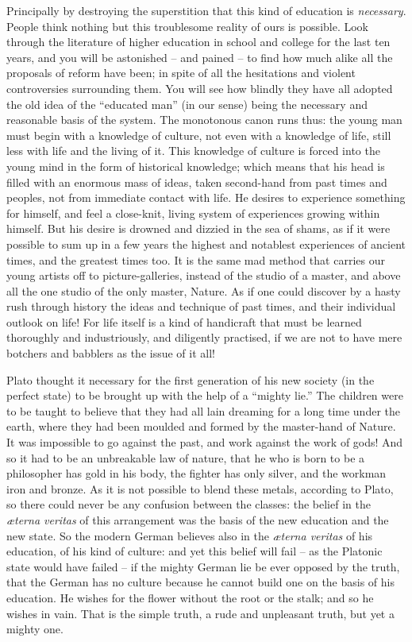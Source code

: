 Principally by destroying the superstition that this kind of
education is \textit{necessary}. People think nothing but this troublesome
reality of ours is possible. Look through the literature of higher
education in school and college for the last ten years, and you will
be astonished -- and pained -- to find how much alike all the proposals
of reform have been; in spite of all the hesitations and violent
controversies surrounding them. You will see how blindly they have
all adopted the old idea of the \enquote{educated man} (in our sense) being
the necessary and reasonable basis of the system. The monotonous
canon runs thus: the young man must begin with a knowledge of
culture, not even with a knowledge of life, still less with life and
the living of it. This knowledge of culture is forced into the young
mind in the form of historical knowledge; which means that his head
is filled with an enormous mass of ideas, taken second-hand from past
times and peoples, not from immediate contact with life. He desires
to experience something for himself, and feel a close-knit, living
system of experiences growing within himself. But his desire is
drowned and dizzied in the sea of shams, as if it were possible to
sum up in a few years the highest and notablest experiences of
ancient times, and the greatest times too. It is the same mad method
that carries our young artists off to picture-galleries, instead of
the studio of a master, and above all the one studio of the only
master, Nature. As if one could discover by a hasty rush through
history the ideas and technique of past times, and their individual
outlook on life! For life itself is a kind of handicraft that must be
learned thoroughly and industriously, and diligently practised, if we
are not to have mere botchers and babblers as the issue of it all!

Plato thought it necessary for the first generation of his new
society (in the perfect state) to be brought up with the help of a
\enquote{mighty lie.} The children were to be taught to believe that they had
all lain dreaming for a long time under the earth, where they had
been moulded and formed by the master-hand of Nature. It was
impossible to go against the past, and work against the work of gods!
And so it had to be an unbreakable law of nature, that he who is born
to be a philosopher has gold in his body, the fighter has only
silver, and the workman iron and bronze. As it is not possible to
blend these metals, according to Plato, so there could never be any
confusion between the classes: the belief in the \textit{æterna veritas} of
this arrangement was the basis of the new education and the new
state. So the modern German believes also in the \textit{æterna veritas} of
his education, of his kind of culture: and yet this belief will
fail -- as the Platonic state would have failed -- if the mighty German
lie be ever opposed by the truth, that the German has no culture
because he cannot build one on the basis of his education. He wishes
for the flower without the root or the stalk; and so he wishes in
vain. That is the simple truth, a rude and unpleasant truth, but yet
a mighty one.

